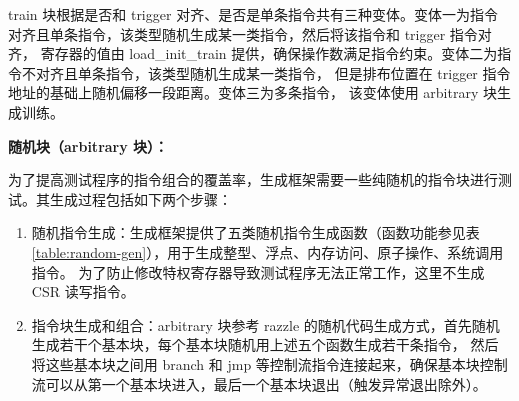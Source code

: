 train 块根据是否和 trigger 对齐、是否是单条指令共有三种变体。变体一为指令对齐且单条指令，该类型随机生成某一类指令，然后将该指令和 trigger 指令对齐，
寄存器的值由 load\_init\_train 提供，确保操作数满足指令约束。变体二为指令不对齐且单条指令，该类型随机生成某一类指令，
但是排布位置在 trigger 指令地址的基础上随机偏移一段距离。变体三为多条指令，
该变体使用 arbitrary 块生成训练。\par

\textbf{随机块（arbitrary 块）：}\par
为了提高测试程序的指令组合的覆盖率，生成框架需要一些纯随机的指令块进行测试。其生成过程包括如下两个步骤：
\begin{enumerate}
    \item 随机指令生成：生成框架提供了五类随机指令生成函数（函数功能参见表\ref{table:random-gen}），用于生成整型、浮点、内存访问、原子操作、系统调用指令。
为了防止修改特权寄存器导致测试程序无法正常工作，这里不生成 CSR 读写指令。\par
    \item 指令块生成和组合：arbitrary 块参考 razzle 的随机代码生成方式，首先随机生成若干个基本块，每个基本块随机用上述五个函数生成若干条指令，
    然后将这些基本块之间用 branch 和 jmp 等控制流指令连接起来，确保基本块控制流可以从第一个基本块进入，最后一个基本块退出（触发异常退出除外）。
\end{enumerate}

\begin{table}[h!]
    \begin{center} 
    \caption{随机指令生成} 
    \label{table:random-gen}  
    \end{center}
\end{table}

